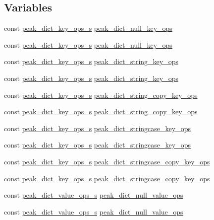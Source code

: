 \subsection*{Variables}
\begin{CompactItemize}
\item 
const \hyperlink{structpeak__dict__key__ops__s}{peak\_\-dict\_\-key\_\-ops\_\-s} \hyperlink{group__dict_ga5}{peak\_\-dict\_\-null\_\-key\_\-ops}
\item 
const \hyperlink{structpeak__dict__key__ops__s}{peak\_\-dict\_\-key\_\-ops\_\-s} \hyperlink{group__dict_ga6}{peak\_\-dict\_\-null\_\-key\_\-ops}
\item 
const \hyperlink{structpeak__dict__key__ops__s}{peak\_\-dict\_\-key\_\-ops\_\-s} \hyperlink{group__dict_ga7}{peak\_\-dict\_\-string\_\-key\_\-ops}
\item 
const \hyperlink{structpeak__dict__key__ops__s}{peak\_\-dict\_\-key\_\-ops\_\-s} \hyperlink{group__dict_ga8}{peak\_\-dict\_\-string\_\-key\_\-ops}
\item 
const \hyperlink{structpeak__dict__key__ops__s}{peak\_\-dict\_\-key\_\-ops\_\-s} \hyperlink{group__dict_ga9}{peak\_\-dict\_\-string\_\-copy\_\-key\_\-ops}
\item 
const \hyperlink{structpeak__dict__key__ops__s}{peak\_\-dict\_\-key\_\-ops\_\-s} \hyperlink{group__dict_ga10}{peak\_\-dict\_\-string\_\-copy\_\-key\_\-ops}
\item 
const \hyperlink{structpeak__dict__key__ops__s}{peak\_\-dict\_\-key\_\-ops\_\-s} \hyperlink{group__dict_ga11}{peak\_\-dict\_\-stringcase\_\-key\_\-ops}
\item 
const \hyperlink{structpeak__dict__key__ops__s}{peak\_\-dict\_\-key\_\-ops\_\-s} \hyperlink{group__dict_ga12}{peak\_\-dict\_\-stringcase\_\-key\_\-ops}
\item 
const \hyperlink{structpeak__dict__key__ops__s}{peak\_\-dict\_\-key\_\-ops\_\-s} \hyperlink{group__dict_ga13}{peak\_\-dict\_\-stringcase\_\-copy\_\-key\_\-ops}
\item 
const \hyperlink{structpeak__dict__key__ops__s}{peak\_\-dict\_\-key\_\-ops\_\-s} \hyperlink{group__dict_ga14}{peak\_\-dict\_\-stringcase\_\-copy\_\-key\_\-ops}
\item 
const \hyperlink{structpeak__dict__value__ops__s}{peak\_\-dict\_\-value\_\-ops\_\-s} \hyperlink{group__dict_ga15}{peak\_\-dict\_\-null\_\-value\_\-ops}
\item 
const \hyperlink{structpeak__dict__value__ops__s}{peak\_\-dict\_\-value\_\-ops\_\-s} \hyperlink{group__dict_ga16}{peak\_\-dict\_\-null\_\-value\_\-ops}

\end{CompactItemize}
